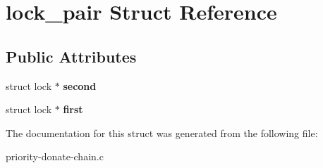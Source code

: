 \hypertarget{structlock__pair}{}\section{lock\+\_\+pair Struct Reference}
\label{structlock__pair}
\subsection*{Public Attributes}
\begin{DoxyCompactItemize}
\item 
struct lock $\ast$ {\bfseries second}\hypertarget{structlock__pair_a00ddf503fd5c8bebf42b7b6f7260385d}{}\label{structlock__pair_a00ddf503fd5c8bebf42b7b6f7260385d}

\item 
struct lock $\ast$ {\bfseries first}\hypertarget{structlock__pair_a3f14665f5bab73940ef5de08a8034850}{}\label{structlock__pair_a3f14665f5bab73940ef5de08a8034850}

\end{DoxyCompactItemize}


The documentation for this struct was generated from the following file\+:\begin{DoxyCompactItemize}
\item 
priority-\/donate-\/chain.\+c\end{DoxyCompactItemize}
